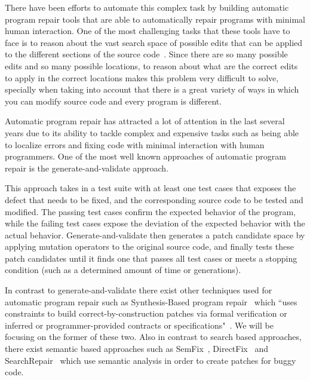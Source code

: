 \documentclass[conference]{IEEEtran}
\newcommand{\todo}[1]
  {{\scriptsize \textbf{\color{red} {#1}}}}
\begin{document}
There have been efforts to automate this complex task by 
building automatic program repair tools that are able to automatically repair 
programs with minimal human interaction. One 
of the most challenging tasks that 
these tools have to face is to reason about the vast search space of possible 
edits that can be applied to the different sections of the source 
code~\cite{long16}. Since 
there are so many possible edits and so many possible locations, to reason about 
what are the correct edits to apply in the correct locations makes this problem 
very difficult to solve, specially when taking into account that there is a 
great variety of ways in which you can modify source code and every program is 
different.

Automatic program repair has attracted a lot of attention in the last several
years due to its ability to tackle complex and expensive tasks such as being
able to localize errors and fixing code with minimal interaction with human
programmers. One of the most well known approaches of automatic program repair
is the generate-and-validate approach. 

This approach takes in a test suite with at least one test cases that exposes 
the defect that needs to be fixed, and the corresponding source code to be 
tested and modified. The passing test cases confirm the
expected behavior of the program, while the failing test cases expose the
deviation of the expected behavior with the actual behavior. 
Generate-and-validate then generates a patch candidate space by applying 
mutation operators to the original source code, and finally tests these patch 
candidates until it finds one that passes all test cases or meets a stopping 
condition (such as a determined amount of time or generations). 


  
 In contrast to generate-and-validate there exist other techniques used for 
automatic program repair such as Synthesis-Based program 
repair~\cite{jin11,pei14} which ``uses constraints to build 
correct-by-construction patches via formal verification or inferred or 
programmer-provided contracts
or specifications"~\cite{smith15}. We will be focusing on the former of these 
two. Also in contrast to search based approaches, there exist semantic based approaches such as SemFix~\cite{nguyen13}, DirectFix~\cite{mechtaev15} and SearchRepair~\cite{ke15} which use semantic analysis in order to create patches for buggy code.
\end{document}
